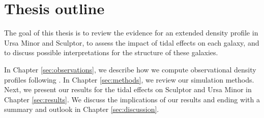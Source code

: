 \section{Thesis outline}\label{thesis-outline}

The goal of this thesis is to review the evidence for an extended
density profile in Ursa Minor and Sculptor, to assess the impact of
tidal effects on each galaxy, and to discuss possible interpretations
for the structure of these galaxies.

In Chapter \ref{sec:observations}, we describe how we compute
observational density profiles following \citet{jensen+2024}. In Chapter
\ref{sec:methods}, we review our simulation methods. Next, we present
our results for the tidal effects on Sculptor and Ursa Minor in Chapter
\ref{sec:results}. We discuss the implications of our results and ending
with a summary and outlook in Chapter \ref{sec:discussion}.
